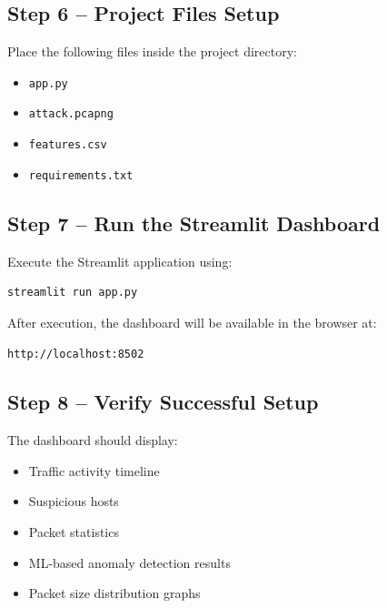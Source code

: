 \documentclass[12pt,a4paper]{article}
\begin{document}
	\vspace{0.5cm}
	
	\subsection*{Step 6 -- Project Files Setup}
	
	Place the following files inside the project directory:
	
	\begin{itemize}
		\item \texttt{app.py}
		\item \texttt{attack.pcapng}
		\item \texttt{features.csv}
		\item \texttt{requirements.txt}
	\end{itemize}
	
	\vspace{0.5cm}
	
	\subsection*{Step 7 -- Run the Streamlit Dashboard}
	
	Execute the Streamlit application using:
	
	\begin{lstlisting}[language=bash]
		streamlit run app.py
	\end{lstlisting}
	
	After execution, the dashboard will be available in the browser at:
	
	\begin{center}
		\texttt{http://localhost:8502}
	\end{center}
	
	\vspace{0.5cm}
	
	\subsection*{Step 8 -- Verify Successful Setup}
	
	The dashboard should display:
	
	\begin{itemize}
		\item Traffic activity timeline
		\item Suspicious hosts
		\item Packet statistics
		\item ML-based anomaly detection results
		\item Packet size distribution graphs
	\end{itemize}
\end{document}
